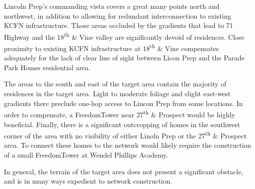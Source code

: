  Lincoln Prep's commanding vista covers
a great many points north and northwest, in addition to allowing for redundant
interconnection to existing KCFN infrastructure.  Those areas occluded by the
gradients that lead to 71 Highway and the 18\textsuperscript{th} \& Vine valley are
significantly devoid of residences.  Close proximity to
existing KCFN infrastructure at 18\textsuperscript{th} \& Vine compensates adequately for the
lack of clear line of sight  between Licon Prep and the Parade Park Homes
residential area. \par
The areas to the south and east of the target area contain the
majority of residences in the target area. Light to moderate foliage and slight
east-west gradients there preclude one-hop access to Lincon Prep from some
locations. In order to compensate, a FreedomTower near 27\textsuperscript{th} \& Prospect
would be highly beneficial.
Finally, there is a significant outcropping of homes in the southwest corner of
the area with no visibility of either Linoln Prep or the 27\textsuperscript{th} \& Prospect
area. To connect these homes to the network would likely require the
construction of a small FreedomTower at Wendel Phillips Academy. \par
In general, the terrain of the target area does not present a significant
obstacle, and is in many ways expedient to network construction. \par
